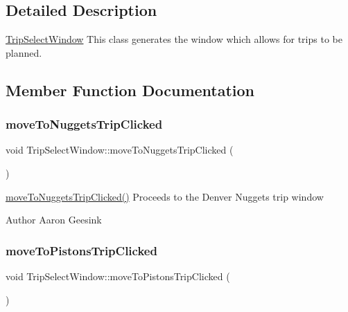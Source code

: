 \subsection{Detailed Description}
\mbox{\hyperlink{class_trip_select_window}{Trip\+Select\+Window}} This class generates the window which allows for trips to be planned. 

\subsection{Member Function Documentation}
\mbox{\label{class_trip_select_window_ae012956bf7e4a6a95e1195de49a964b6}} 
\subsubsection{\texorpdfstring{moveToNuggetsTripClicked}{moveToNuggetsTripClicked}}
{\footnotesize\ttfamily void Trip\+Select\+Window\+::move\+To\+Nuggets\+Trip\+Clicked (\begin{DoxyParamCaption}{ }\end{DoxyParamCaption})\hspace{0.3cm}{\ttfamily [signal]}}



\mbox{\hyperlink{class_trip_select_window_ae012956bf7e4a6a95e1195de49a964b6}{move\+To\+Nuggets\+Trip\+Clicked()}} Proceeds to the Denver Nuggets trip window 

\begin{DoxyAuthor}{Author}
Aaron Geesink 
\end{DoxyAuthor}
\mbox{\label{class_trip_select_window_a42a599fbfb64df27a27a0cf3b44592db}} 
\subsubsection{\texorpdfstring{moveToPistonsTripClicked}{moveToPistonsTripClicked}}
{\footnotesize\ttfamily void Trip\+Select\+Window\+::move\+To\+Pistons\+Trip\+Clicked (\begin{DoxyParamCaption}{ }\end{DoxyParamCaption})\hspace{0.3cm}{\ttfamily [signal]}}



